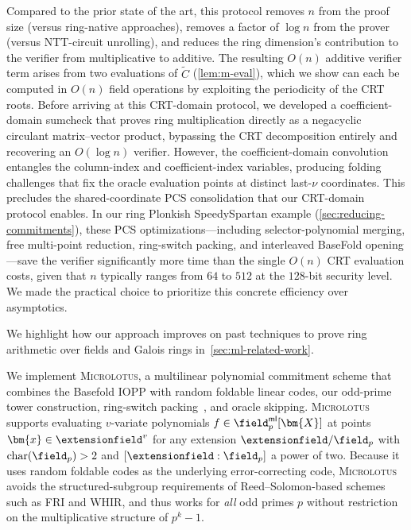 Compared to the prior state of the art, this protocol removes $n$ from the proof size (versus ring-native approaches), removes a factor of $\log n$ from the prover (versus NTT-circuit unrolling), and reduces the ring dimension's contribution to the verifier from multiplicative to additive. The resulting $O(n)$ additive verifier term arises from two evaluations of $\tilde{C}$ (\cref{lem:m-eval}), which we show can each be computed in $O(n)$ field operations by exploiting the periodicity of the CRT roots. Before arriving at this CRT-domain protocol, we developed a coefficient-domain sumcheck that proves ring multiplication directly as a negacyclic circulant matrix--vector product, bypassing the CRT decomposition entirely and recovering an $O(\log n)$ verifier. However, the coefficient-domain convolution entangles the column-index and coefficient-index variables, producing folding challenges that fix the oracle evaluation points at distinct last-$\nu$ coordinates. This precludes the shared-coordinate PCS consolidation that our CRT-domain protocol enables. In our ring Plonkish SpeedySpartan example (\cref{sec:reducing-commitments}), these PCS optimizations---including selector-polynomial merging, free multi-point reduction, ring-switch packing, and interleaved BaseFold opening---save the verifier significantly more time than the single $O(n)$ CRT evaluation costs, given that $n$ typically ranges from $64$ to $512$ at the $128$-bit security level. We made the practical choice to prioritize this concrete efficiency over asymptotics.

We highlight how our approach improves on past techniques to prove ring arithmetic over fields and Galois rings in~\cref{sec:ml-related-work}.

We implement \textsc{Microlotus}, a multilinear polynomial commitment scheme that combines the Basefold IOPP with random foldable linear codes, our odd-prime tower construction, ring-switch packing~\cite{EC:DiaPos25}, and oracle skipping. \textsc{Microlotus} supports evaluating $v$-variate polynomials $f \in \field_p^{\mathsf{ml}}[\bm{X}]$ at points $\bm{x} \in \extensionfield^v$ for any extension $\extensionfield/\field_p$ with $\operatorname{char}(\field_p) > 2$ and $[\extensionfield : \field_p]$ a power of two. Because it uses random foldable codes as the underlying error-correcting code, \textsc{Microlotus} avoids the structured-subgroup requirements of Reed--Solomon-based schemes such as FRI and WHIR, and thus works for \emph{all} odd primes $p$ without restriction on the multiplicative structure of $p^k - 1$.

